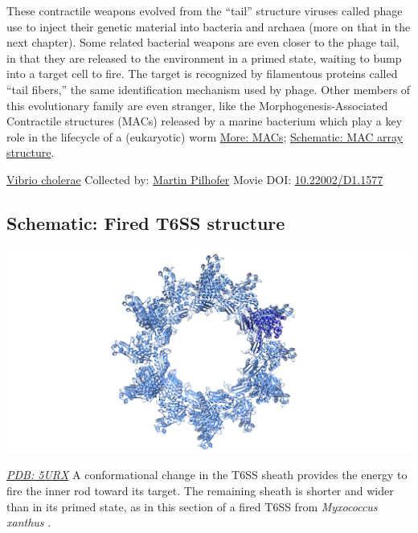 \documentclass[]{tufte-book}
\begin{document}
These contractile weapons evolved from the ``tail'' structure viruses called phage use to inject their genetic material into bacteria and archaea (more on that in the next chapter). Some related bacterial weapons are even closer to the phage tail, in that they are released to the environment in a primed state, waiting to bump into a target cell to fire. The target is recognized by filamentous proteins called ``tail fibers,'' the same identification mechanism used by phage. Other members of this evolutionary family are even stranger, like the Morphogenesis-Associated Contractile structures (MACs) released by a marine bacterium which play a key role in the lifecycle of a (eukaryotic) worm \protect\hyperlink{MACs}{More: MACs}; \protect\hyperlink{MAC_array_structure}{Schematic: MAC array structure}.



\hypertarget{htmlwidget-dad5f73bf5e659df6e3b}{}

\label{fig:9-7}\protect\hyperlink{tree}{Vibrio cholerae} Collected by: \protect\hyperlink{martin_pilhofer}{Martin Pilhofer} Movie DOI: \href{https://doi.org/10.22002/D1.1577}{10.22002/D1.1577}

\hypertarget{Fired_T6SS_structure}{%
\subsection*{Schematic: Fired T6SS structure}\label{Fired_T6SS_structure}}

\includegraphics{img/schematics/9_7_1}

\href{http://rcsb.org/structure/5URX}{\emph{PDB: 5URX}}
A conformational change in the T6SS sheath provides the energy to fire the inner rod toward its target. The remaining sheath is shorter and wider than in its primed state, as in this section of a fired T6SS from \emph{Myxococcus xanthus} \citep{chang2017}.
\end{document}

